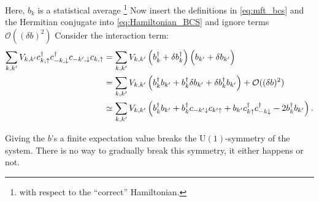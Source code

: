Here, $b_k$ is a statistical average \footnote{with respect to the ``correct'' Hamiltonian.}
Now insert the definitions in \cref{eq:mft_bcs} and the Hermitian conjugate into \cref{eq:Hamiltonian_BCS} and ignore terms $\mathcal{O}((\delta b)^2)$
Consider the interaction term:
\begin{align*}
\sum_{k,k'}V_{k,k'} c^{\dagger}_{k,\uparrow}c^{\dagger}_{-k, \downarrow}c_{-k',\downarrow}c_{k,\uparrow}
 &= \sum_{k,k'}V_{k,k'} \left(b_k^\dagger + \delta b_k^\dagger\right)\left(b_{k'} + \delta b_{k'}\vphantom{b_k^\dagger}\right)\\
&= \sum_{k,k'}V_{k,k'}\left(b_k^\dagger b_{k'} + b_k^\dagger\delta b_{k'} + \delta b_k^\dagger b_{k'}\right) + \mathcal{O}((\delta b)^2)\\
&\simeq \sum_{k,k'}V_{k,k'}\left(b_k^\dagger b_{k'} + b_k^\dagger c_{-k'\downarrow}c_{k'\uparrow} + b_{k'}c^{\dagger}_{k\uparrow}c^{\dagger}_{-k\downarrow} - 2b^\dagger_kb_{k'}\right).
\end{align*}




Giving the $b$'s a finite expectation value breaks the $\mathrm{U}(1)$-symmetry of the system. There is no way to gradually break this symmetry, it either happens or not. 